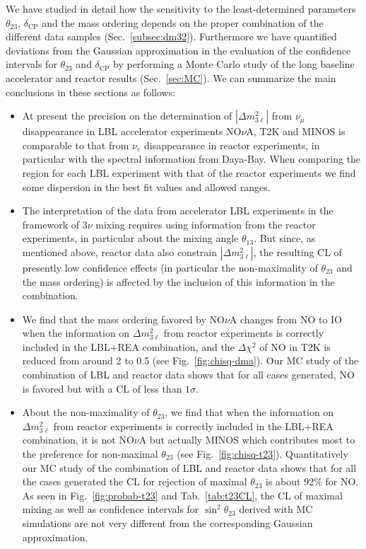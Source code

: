 \documentclass[a4paper, 11pt]{article}
\newcommand{\Dmq}{\Delta m^2}
\begin{document}
We have studied in detail how the sensitivity to the least-determined
parameters $\theta_{23}$, $\delta_\text{CP}$ and the mass ordering
depends on the proper combination of the different data samples
(Sec.~\ref{subsec:dm32}).  Furthermore we have quantified deviations
from the Gaussian approximation in the evaluation of the confidence
intervals for $\theta_{23}$ and $\delta_\text{CP}$ by performing a
Monte Carlo study of the long baseline accelerator and reactor results
(Sec.~\ref{sec:MC}).  We can summarize the main conclusions in these
sections as follows:
%
\begin{itemize}
\item At present the precision on the determination of
  $|\Dmq_{3\ell}|$ from $\nu_\mu$ disappearance in LBL accelerator
  experiments NO$\nu$A, T2K and MINOS is comparable to that from
  $\nu_e$ disappearance in reactor experiments, in particular with the
  spectral information from Daya-Bay. When comparing the region for
  each LBL experiment with that of the reactor experiments we find
  some dispersion in the best fit values and allowed ranges.

\item The interpretation of the data from accelerator LBL experiments
  in the framework of $3\nu$ mixing requires using information from
  the reactor experiments, in particular about the mixing angle
  $\theta_{13}$.  But since, as mentioned above, reactor data also
  constrain $|\Dmq_{3\ell}|$, the resulting CL of presently low
  confidence effects (in particular the non-maximality of
  $\theta_{23}$ and the mass ordering) is affected by the inclusion of
  this information in the combination.

\item We find that the mass ordering favored by NO$\nu$A changes from
  NO to IO when the information on $\Dmq_{3\ell}$ from reactor
  experiments is correctly included in the LBL+REA combination, and
  the $\Delta\chi^2$ of NO in T2K is reduced from around 2 to 0.5 (see
  Fig.~\ref{fig:chisq-dma}).  Our MC study of the combination of LBL
  and reactor data shows that for all cases generated, NO is favored
  but with a CL of less than $1\sigma$.

\item About the non-maximality of $\theta_{23}$, we find that when the
  information on $\Dmq_{3\ell}$ from reactor experiments is correctly
  included in the LBL+REA combination, it is not NO$\nu$A but actually
  MINOS which contributes most to the preference for non-maximal
  $\theta_{23}$ (see Fig.~\ref{fig:chisq-t23}).  Quantitatively our MC
  study of the combination of LBL and reactor data shows that for all
  the cases generated the CL for rejection of maximal $\theta_{23}$ is
  about 92\% for NO.  As seen in Fig.~\ref{fig:probab-t23} and
  Tab.~\ref{tab:t23CL}, the CL of maximal mixing as well as confidence
  intervals for $\sin^2\theta_{23}$ derived with MC simulations are
  not very different from the corresponding Gaussian approximation.


\end{itemize}
\end{document}
